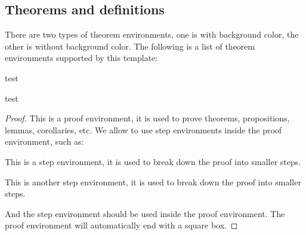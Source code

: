 \subsection{Theorems and definitions}
    
    There are two types of theorem environments, one is with background color, the other is without background color. 
    The following is a list of theorem environments supported by this template:

    \begin{definition}
        test    
    \end{definition}
    \begin{proposition}
        test 
    \end{proposition}
    \begin{proof}
        This is a proof environment, it is used to prove theorems, propositions, lemmas, corollaries, etc.
        We allow to use step environments inside the proof environment, such as:
        \begin{step}\label{step:1_in_proof_1}
            This is a step environment, it is used to break down the proof into smaller steps.
        \end{step}
        \begin{step}\label{step:2_in_proof_1}
            This is another step environment, it is used to break down the proof into smaller steps.
        \end{step}
        And the step environment should be used inside the proof environment.
        The proof environment will automatically end with a square box.
    \end{proof}
    
